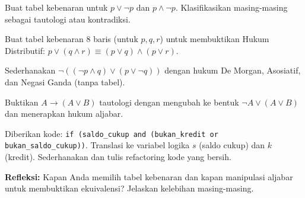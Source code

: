 \documentclass[../main]{subfiles}
\begin{document}

\begin{latihan}
  \item Buat tabel kebenaran untuk $p \vee \neg p$ dan $p \wedge \neg p$. Klasifikasikan masing-masing sebagai tautologi atau kontradiksi.
  \item Buat tabel kebenaran 8 baris (untuk $p, q, r$) untuk membuktikan Hukum Distributif: $p \vee (q \wedge r) \equiv (p \vee q) \wedge (p \vee r)$.
  \item Sederhanakan $\neg((\neg p \wedge q) \vee (p \vee \neg q))$ dengan hukum De Morgan, Asosiatif, dan Negasi Ganda (tanpa tabel).
  \item Buktikan $A \rightarrow (A \vee B)$ tautologi dengan mengubah ke bentuk $\neg A \vee (A \vee B)$ dan menerapkan hukum aljabar.
  \item Diberikan kode: \texttt{if (saldo\_cukup and (bukan\_kredit or bukan\_saldo\_cukup))}. Translasi ke variabel logika $s$ (saldo cukup) dan $k$ (kredit). Sederhanakan dan tulis refactoring kode yang bersih.
  \item \textbf{Refleksi:} Kapan Anda memilih tabel kebenaran dan kapan manipulasi aljabar untuk membuktikan ekuivalensi? Jelaskan kelebihan masing-masing.
\end{latihan}

\end{document}
